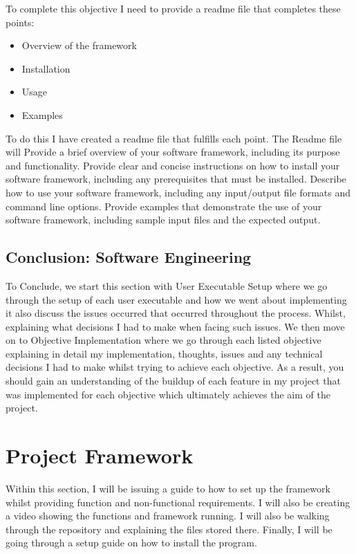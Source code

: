 \documentclass[]{final_report}
\begin{document}
To complete this objective I need to provide a readme file that completes these points:

\begin{itemize}
    \item Overview of the framework
    \item Installation
    \item Usage
    \item Examples
\end{itemize}

To do this I have created a readme file that fulfills each point. The Readme file will Provide a brief overview of your software framework, including its purpose and functionality. Provide clear and concise instructions on how to install your software framework, including any prerequisites that must be installed. Describe how to use your software framework, including any input/output file formats and command line options. Provide examples that demonstrate the use of your software framework, including sample input files and the expected output.

\subsection{Conclusion: Software Engineering}
To Conclude, we start this section with User Executable Setup where we go through the setup of each user executable and how we went about implementing it also discuss the issues occurred that occurred throughout the process. Whilst, explaining what decisions I had to make when facing such issues. We then move on to Objective Implementation where we go through each listed objective explaining in detail my implementation, thoughts, issues and any technical decisions I had to make whilst trying to achieve each objective. As a result, you should gain an understanding of the buildup of each feature in my project that was implemented for each objective which ultimately achieves the aim of the project.


\section{Project Framework}
Within this section, I will be issuing a guide to how to set up the framework whilst providing function and non-functional requirements. I will also be creating a video showing the functions and framework running. I will also be walking through the repository and explaining the files stored there. Finally, I will be going through a setup guide on how to install the program.
\end{document}
